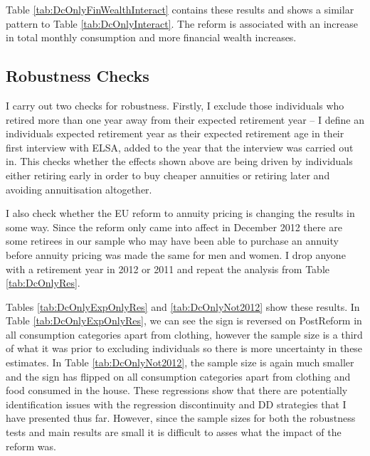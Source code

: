 \documentclass[12pt]{article}
\begin{document}
Table \ref{tab:DcOnlyFinWealthInteract} contains these results and shows a
similar pattern to Table \ref{tab:DcOnlyInteract}. The reform is associated with
an increase in total monthly consumption and more financial wealth increases.

\subsection{Robustness Checks}

I carry out two checks for robustness. Firstly, I exclude those individuals who
retired more than one year away from their expected retirement year -- I define
an individuals expected retirement year as their expected retirement age in
their first interview with ELSA, added to the year that the interview was
carried out in. This checks whether the effects shown above are being driven by
individuals either retiring early in order to buy cheaper annuities or retiring
later and avoiding annuitisation altogether.

I also check whether the EU reform to annuity pricing is changing the results in
some way. Since the reform only came into affect in December 2012 there are some
retirees in our sample who may have been able to purchase an annuity before
annuity pricing was made the same for men and women. I drop anyone with a
retirement year in 2012 or 2011 and repeat the analysis from Table
\ref{tab:DcOnlyRes}.

\begin{landscape}
    \linespread{1}
    
\end{landscape}

\begin{landscape}
    \linespread{1}
    
\end{landscape}

Tables \ref{tab:DcOnlyExpOnlyRes} and \ref{tab:DcOnlyNot2012} show these
results. In Table \ref{tab:DcOnlyExpOnlyRes}, we can see the sign is reversed on
PostReform in all consumption categories apart from clothing, however the sample
size is a third of what it was prior to excluding individuals so there is more
uncertainty in these estimates. In Table \ref{tab:DcOnlyNot2012}, the sample
size is again much smaller and the sign has flipped on all consumption
categories apart from clothing and food consumed in the house. These regressions
show that there are potentially identification issues with the regression
discontinuity and DD strategies that I have presented thus far. However, since
the sample sizes for both the robustness tests and main results are small it is
difficult to asses what the impact of the reform was.
\end{document}
